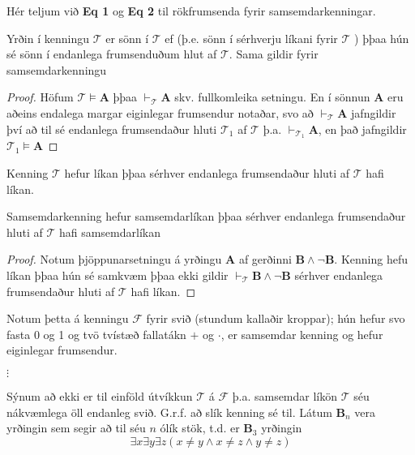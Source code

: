 \documentclass[12pt]{book}
\newcommand{\mb}[1]{\mathbf{#1}}
\newcommand{\mc}[1]{\mathcal{#1}}
\begin{document}
\begin{ath}
 Hér teljum við \textbf{Eq 1} og \textbf{Eq 2} til rökfrumsenda fyrir
 samsemdarkenningar.
\end{ath}

\begin{setn}[Þjöppunarsetning]
  Yrðin í kenningu $\mathcal{T}$ er sönn í $\mathcal{T}$ ef (þ.e. sönn
  í sérhverju líkani fyrir $\mathcal{T}$ ) þþaa
  hún sé sönn í endanlega frumsenduðum hlut af $\mathcal{T}$.
  Sama gildir fyrir samsemdarkenningu
\end{setn}

\begin{proof}
  Höfum $\mathcal{T} \models \mathbf{A}$ þþaa $\vdash_{\mathcal{T}} \mathbf{A}$
  skv. fullkomleika setningu. En í sönnun $\mathbf{A}$ eru aðeins endalega
  margar eiginlegar frumsendur notaðar, svo að $\vdash_{\mathcal{T}} \mathbf{A}$
  jafngildir því að til sé endanlega frumsendaður hluti $\mathcal{T}_{1}$
  af $\mathcal{T}$ þ.a. $\vdash_{\mathcal{T}_1} \mathbf{A}$, en það jafngildir
  $\mathcal{T}_1 \models \mathbf{A}$
\end{proof}
\begin{setn}[Fylgisetn]
  Kenning $\mathcal{T}$ hefur líkan þþaa sérhver endanlega
  frumsendaður hluti af $\mathcal{T}$ hafi líkan.
  
  Samsemdarkenning hefur samsemdarlíkan þþaa sérhver endanlega frumsendaður
  hluti af $\mathcal{T}$ hafi samsemdarlíkan
\end{setn}

\begin{proof}
  Notum þjöppunarsetningu á yrðingu $\mathbf{A}$ af gerðinni
  $\mathbf{B} \wedge \lnot \mathbf{B}$. Kenning hefu líkan þþaa
  hún sé samkvæm þþaa ekki gildir $\vdash_{\mathcal{T}} \mathbf{B} \wedge \lnot \mathbf{B}$
  sérhver endanlega frumsendaður hluti af $\mathcal{T}$ hafi líkan.
\end{proof}

\begin{daemi}
  Notum þetta á kenningu $\mathcal{F}$ fyrir svið (stundum kallaðir kroppar);
  hún hefur svo fasta 0 og 1 og tvö tvístæð fallatákn $+$ og $\cdot$, er samsemdar
  kenning og hefur eiginlegar frumsendur.
\end{daemi}


$\vdots$

Sýnum að ekki er til einföld útvíkkun $\mathcal{T}$ á $\mc{F}$ þ.a.
samsemdar líkön $\mc{T}$ séu nákvæmlega öll endanleg svið. G.r.f. að
slík kenning sé til. Látum $\mb{B}_n$ vera yrðingin sem segir að til séu
$n$ ólík stök, t.d. er $\mb{B}_{3}$ yrðingin
\[\exists x \exists y \exists z ( x \neq y \wedge x \neq z \wedge y \neq z)\]
\end{document}
